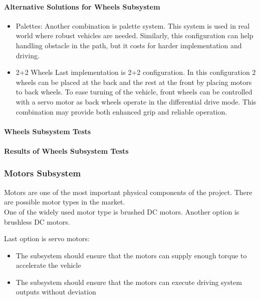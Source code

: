 \documentclass[a4paper,12pt]{article}
\begin{document}
	\paragraph{Alternative Solutions for Wheels Subsystem}
	\begin{itemize}
		\item{Palettes:} 	Another combination is palette system. This system is used in real world where robust vehicles are needed. Similarly, this configuration can help handling obstacle in the path, but it costs for harder implementation and driving.
		
		\item{2+2 Wheels} 	Last implementation is 2+2 configuration. In this configuration 2 wheels can be placed at the back and the rest at the front by placing motors to back wheels. To ease turning of the vehicle, front wheels can be controlled with a servo motor as back wheels operate in the differential drive mode. This combination may provide both enhanced grip and reliable	 operation.
	\end{itemize}

	\paragraph{Wheels Subsystem Tests}
	
	\paragraph{Results of Wheels Subsystem Tests}

	
	\subsubsection{Motors Subsystem}
	Motors are one of the most important physical components of the project. There are possible motor types in the market.\\
	
	One of the widely used motor type is brushed DC motors. 
	Another option is brushless DC motors. 
	
	Last option is servo motors:
	\begin{itemize}
		\item The subsystem should ensure that the motors can supply enough torque to accelerate the vehicle		
		\item  The subsystem should ensure that the motors can execute driving system outputs without deviation 
	\end{itemize}
	
\end{document}
